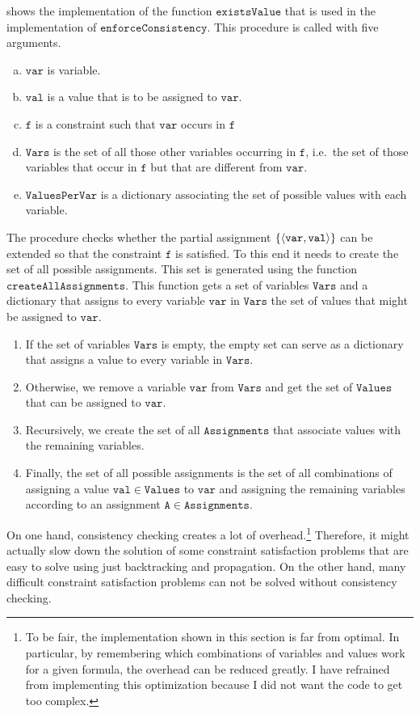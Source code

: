 \noindent
{} shows the implementation of the function $\mathtt{existsValue}$ that
is used in the implementation of $\mathtt{enforceConsistency}$.  This procedure is called with five arguments.
\begin{enumerate}[(a)]
\item $\mathtt{var}$ is variable.
\item $\mathtt{val}$ is a value that is to be assigned to $\mathtt{var}$.
\item $\mathtt{f}$ is a constraint such that $\mathtt{var}$ occurs in $\mathtt{f}$
\item $\mathtt{Vars}$ is the set of all those other variables occurring in $\mathtt{f}$, i.e.~the set of those
      variables that occur in $\mathtt{f}$ but that are different from $\mathtt{var}$. 
\item $\mathtt{ValuesPerVar}$  is a dictionary associating the set of possible values with each variable.
\end{enumerate}
The procedure checks whether the partial assignment $\{ \pair(\mathtt{var}, \mathtt{val}) \}$ can be
extended so that the constraint $\mathtt{f}$ is satisfied.  To this end it needs to create the set of all
possible assignments.  This set is generated using the function $\mathtt{createAllAssignments}$.  This function
gets a set of variables $\mathtt{Vars}$ and a dictionary that assigns to every variable $\mathtt{var}$ in
$\mathtt{Vars}$ the set of values that might be assigned to $\mathtt{var}$.
\begin{enumerate}
\item If the set of variables $\mathtt{Vars}$ is empty, the empty set can serve as a dictionary that 
      assigns a value to every variable in $\mathtt{Vars}$.
\item Otherwise, we remove a variable $\mathtt{var}$ from $\mathtt{Vars}$ and get the set of $\mathtt{Values}$
      that can be assigned to $\mathtt{var}$.  
\item Recursively, we create the set of all $\mathtt{Assignments}$ that associate values with the remaining 
      variables.
\item Finally, the set of all possible assignments is the set of all combinations of assigning a value 
      $\mathtt{val} \in \mathtt{Values}$ to $\mathtt{var}$ and assigning the remaining variables according to 
      an assignment $\mathtt{A} \in \mathtt{Assignments}$.
\end{enumerate}
On one hand, consistency checking creates a lot of overhead.\footnote{
  To be fair, the implementation shown in this section is far from optimal.  In particular, by remembering which
  combinations of variables and values work for a given formula, the overhead can be reduced greatly.  I have
  refrained from implementing this optimization because I did not want the code to get too complex.
}
Therefore, it might actually slow down the
solution of some constraint satisfaction problems that are easy to solve using just backtracking and
propagation.  On the other hand, many difficult constraint satisfaction problems can not be solved
without consistency checking.

